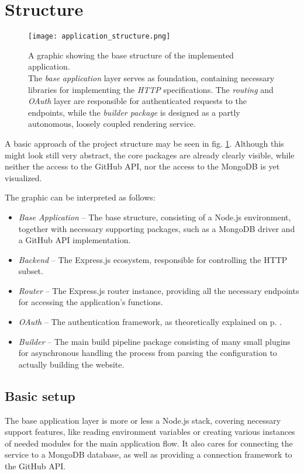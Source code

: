 \section{Structure}
\label{sec:structure}

\begin{figure}[b] %
    \centering
    \texttt{[image: application\_structure.png]}
    \caption{A graphic showing the base structure of the implemented application.\\ The \emph{base application} layer serves as foundation, containing necessary libraries for implementing the \emph{HTTP} specifications. The \emph{routing} and \emph{OAuth} layer are responsible for authenticated requests to the endpoints, while the \emph{builder package} is designed as a partly autonomous, loosely coupled rendering service.}
    \label{fig:application_structure}
\end{figure}
%

A basic approach of the project structure may be seen in fig. \ref{fig:application_structure}. Although this might look still very abstract, the core packages are already clearly visible, while neither the access to the GitHub API, nor the access to the MongoDB is yet visualized.

The graphic can be interpreted as follows:

\begin{itemize}
  \item \emph{Base Application} -- The base structure, consisting of a Node.js environment, together with necessary supporting packages, such as a MongoDB driver and a GitHub API implementation.
  \item \emph{Backend} -- The Express.js ecosystem, responsible for controlling the HTTP subset.
  \item \emph{Router} -- The Express.js router instance, providing all the necessary endpoints for accessing the application's functions.
  \item \emph{OAuth} -- The authentication framework, as theoretically explained on p. \pageref{sec:foundation-express-oauth}.
  \item \emph{Builder} -- The main build pipeline package consisting of many small plugins for asynchronous handling the process from parsing the configuration to actually building the website.
\end{itemize}

\subsection{Basic setup}
The base application layer is more or less a Node.js stack, covering necessary support features, like reading environment variables or creating various instances of needed modules for the main application flow. It also cares for connecting the service to a MongoDB database, as well as providing a connection framework to the GitHub API.

